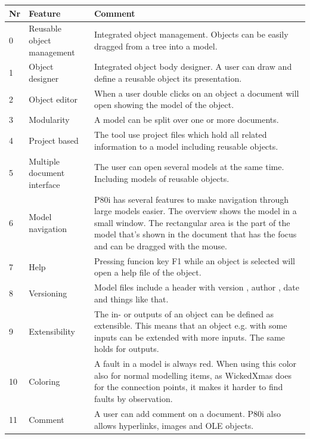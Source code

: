 \documentclass[a4paper,11pt,final]{article}
\begin{document}
\begin{center}
\begin{small}
\begin{tabular}{ | l | p{6cm} | p{8cm} | }
\hline
    \textbf{Nr} & \textbf{Feature} & \textbf{Comment} \\ \hline
    0 & Reusable object management & Integrated object management.
    Objects can be easily dragged from a tree into a model. \\ \hline
    1 & Object designer & Integrated object body designer. A user can draw and define a reusable object its presentation. \\ \hline
    2 & Object editor & When a user double clicks on an object a document will open showing the model of the object.\\ \hline
    3 & Modularity & A model can be split over one or more documents. \\ \hline
    4 & Project based & The tool use project files which hold all related information to a model including reusable objects.\\ \hline
    5 & Multiple document interface & The user can open several models at the same time. Including models of reusable objects. \\ \hline
    6 & Model navigation & P80i has several features to make navigation through large models easier. The overview shows the model in
    a small window. The rectangular area is the part of the model that's shown in the document that has the focus and can be dragged with the mouse.\\ \hline
    7 & Help &  Pressing funcion key F1 while an object is selected will open a help file of the object.\\ \hline
    8 & Versioning & Model files include a header with version , author , date and things like that. \\ \hline
    9 & Extensibility  & The in- or outputs of an object can be defined as extensible. This means that an object e.g. with
    some inputs can be extended with more inputs. The same holds for outputs. \\ \hline
    10 & Coloring &  A fault in a model is always red. When using this color also for normal modelling items, as WickedXmas does for the connection points, it makes it harder to find faults by observation. \\ \hline
    11 & Comment & A user can add comment on a document. P80i also allows hyperlinks, images and OLE objects.\\ \hline

\end{tabular}
\end{small}
\end{center}
\end{document}
